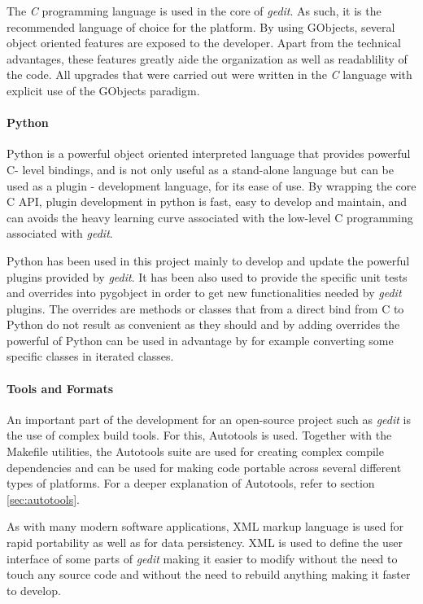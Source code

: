 The \emph{C} programming language is used in the core of \emph{gedit}.   As such, it is 
the recommended language of choice for the platform.  By using GObjects, several 
object oriented features are exposed to the developer.  Apart from the technical advantages, 
these features greatly aide the organization as well as readablility of the code.
All upgrades that were carried out were written in the \emph{C} language with explicit
use of the GObjects paradigm. 

\paragraph{Python}

Python is a powerful object oriented interpreted language that provides powerful 
C- level bindings, and is not only useful as a stand-alone language but can be used 
as a plugin - development language, for its ease of use.   By wrapping the core 
C API, plugin development in python is fast, easy to develop and maintain, and 
can avoids the heavy learning curve associated with the low-level C programming 
associated with \emph{gedit}.

Python has been used in this project mainly to develop and update the powerful 
plugins provided by \emph{gedit}. It has been also used to provide the specific 
unit tests and overrides into pygobject in order to get new functionalities needed by 
\emph{gedit} plugins. The overrides are methods or classes that from a direct 
bind from C to Python do not result as convenient as they should and by adding 
overrides the powerful of Python can be used in advantage by for example converting
some specific classes in iterated classes.


\paragraph{Tools and Formats}


An important part of the development for an open-source project such as \emph{gedit} is 
the use of complex build tools.   For this, Autotools is used. 
Together with the Makefile utilities, the Autotools suite are used for creating complex
compile dependencies and can be used for making code portable across several different 
types of platforms. For a deeper explanation of Autotools, refer to section \ref{sec:autotools}.

As with many modern software applications, XML markup language is used for 
rapid portability as well as for data persistency. XML is used to 
define the user interface of some parts of \emph{gedit} making it easier to
modify without the need to touch any source code and without the need to 
rebuild anything making it faster to develop.


